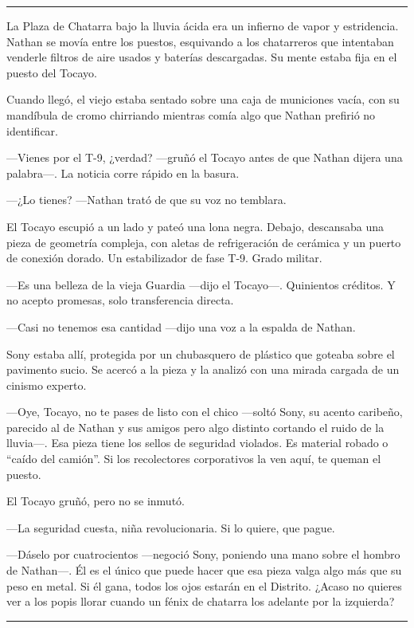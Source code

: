 \documentclass[12pt,a4paper]{book}
\begin{document}
\bigskip
\noindent\rule{\textwidth}{0.4pt}
\bigskip

La Plaza de Chatarra bajo la lluvia ácida era un infierno de vapor y estridencia. Nathan se movía entre los puestos, esquivando a los chatarreros que intentaban venderle filtros de aire usados y baterías descargadas. Su mente estaba fija en el puesto del Tocayo.

Cuando llegó, el viejo estaba sentado sobre una caja de municiones vacía, con su mandíbula de cromo chirriando mientras comía algo que Nathan prefirió no identificar.

---Vienes por el T-9, ¿verdad? ---gruñó el Tocayo antes de que Nathan dijera una palabra---. La noticia corre rápido en la basura.

---¿Lo tienes? ---Nathan trató de que su voz no temblara.

El Tocayo escupió a un lado y pateó una lona negra. Debajo, descansaba una pieza de geometría compleja, con aletas de refrigeración de cerámica y un puerto de conexión dorado. Un estabilizador de fase T-9. Grado militar.

---Es una belleza de la vieja Guardia ---dijo el Tocayo---. Quinientos créditos. Y no acepto promesas, solo transferencia directa.

---Casi no tenemos esa cantidad ---dijo una voz a la espalda de Nathan.

Sony estaba allí, protegida por un chubasquero de plástico que goteaba sobre el pavimento sucio. Se acercó a la pieza y la analizó con una mirada cargada de un cinismo experto.

---Oye, Tocayo, no te pases de listo con el chico ---soltó Sony, su acento caribeño, parecido al de Nathan y sus amigos pero algo distinto cortando el ruido de la lluvia---. Esa pieza tiene los sellos de seguridad violados. Es material robado o ``caído del camión''. Si los recolectores corporativos la ven aquí, te queman el puesto.

El Tocayo gruñó, pero no se inmutó.

---La seguridad cuesta, niña revolucionaria. Si lo quiere, que pague.

---Dáselo por cuatrocientos ---negoció Sony, poniendo una mano sobre el hombro de Nathan---. Él es el único que puede hacer que esa pieza valga algo más que su peso en metal. Si él gana, todos los ojos estarán en el Distrito. ¿Acaso no quieres ver a los popis llorar cuando un fénix de chatarra los adelante por la izquierda?

\bigskip
\noindent\rule{\textwidth}{0.4pt}
\bigskip
\end{document}
